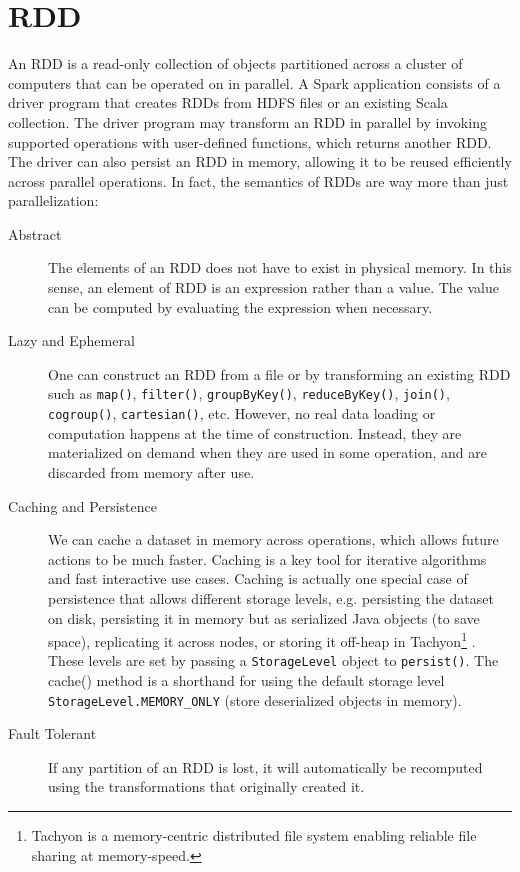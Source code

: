 \documentclass[11pt]{book}
\begin{document}
\section{RDD}
An RDD is a read-only collection of objects partitioned across a cluster of computers that can be operated on in parallel. A Spark application consists of a driver program that creates RDDs from HDFS files or an existing Scala collection. The driver program may transform an RDD in parallel by invoking supported operations with user-defined functions, which returns another RDD. The driver can also persist an RDD in memory, allowing it to be reused efficiently across parallel operations.
In fact, the semantics of RDDs are way more than just parallelization:
\begin{description}
\item[Abstract]
The elements of an RDD does not have to exist in physical memory. In this sense, an element of RDD is an expression rather than a value. The value can be computed by evaluating the expression when necessary.
\item[Lazy and Ephemeral]
One can construct an RDD from a file or by transforming an existing RDD such as \texttt{map()}, \texttt{filter()}, \texttt{groupByKey()}, \texttt{reduceByKey()}, \texttt{join()}, \texttt{cogroup()}, \texttt{cartesian()}, etc. However, no real data loading or computation happens at the time of construction. Instead, they are materialized on demand when they are used in some operation, and are discarded from memory after use.
\item[Caching and Persistence]
We can cache a dataset in memory across operations, which allows future actions to be much faster. Caching is a key tool for iterative algorithms and fast interactive use cases. Caching is actually one special case of  persistence that allows different storage levels, e.g. persisting the dataset on disk, persisting it in memory but as serialized Java objects (to save space), replicating it across nodes, or storing it off-heap in Tachyon\footnote{Tachyon is a memory-centric distributed file system enabling reliable file sharing at memory-speed.} \cite{Tachyon}. These levels are set by passing a \texttt{StorageLevel} object to \texttt{persist()}. The cache() method is a shorthand for using the default storage level \texttt{StorageLevel.MEMORY\_ONLY} (store deserialized objects in memory).
\item[Fault Tolerant]
If any partition of an RDD is lost, it will automatically be recomputed using the transformations that originally created it.
\end{description}
\end{document}
